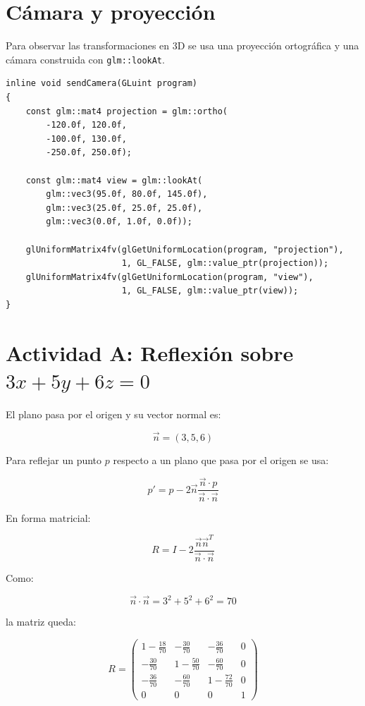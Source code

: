 \documentclass[12pt,a4paper]{article}
\begin{document}
\section*{C\'amara y proyecci\'on}
Para observar las transformaciones en 3D se usa una proyecci\'on ortogr\'afica y una c\'amara construida con \texttt{glm::lookAt}.

\begin{lstlisting}[style=cxxcolor,caption={Envio de matrices de camara al shader.}]
inline void sendCamera(GLuint program)
{
    const glm::mat4 projection = glm::ortho(
        -120.0f, 120.0f,
        -100.0f, 130.0f,
        -250.0f, 250.0f);

    const glm::mat4 view = glm::lookAt(
        glm::vec3(95.0f, 80.0f, 145.0f),
        glm::vec3(25.0f, 25.0f, 25.0f),
        glm::vec3(0.0f, 1.0f, 0.0f));

    glUniformMatrix4fv(glGetUniformLocation(program, "projection"),
                       1, GL_FALSE, glm::value_ptr(projection));
    glUniformMatrix4fv(glGetUniformLocation(program, "view"),
                       1, GL_FALSE, glm::value_ptr(view));
}
\end{lstlisting}

\section*{Actividad A: Reflexi\'on sobre $3x+5y+6z=0$}
El plano pasa por el origen y su vector normal es:

\[
\vec{n}=(3,5,6)
\]

Para reflejar un punto $p$ respecto a un plano que pasa por el origen se usa:

\[
p' = p - 2\vec{n}\frac{\vec{n}\cdot p}{\vec{n}\cdot \vec{n}}
\]

En forma matricial:

\[
R = I - 2\frac{\vec{n}\vec{n}^{T}}{\vec{n}\cdot\vec{n}}
\]

Como:

\[
\vec{n}\cdot\vec{n}=3^2+5^2+6^2=70
\]

la matriz queda:

\[
R =
\begin{pmatrix}
1-\frac{18}{70} & -\frac{30}{70} & -\frac{36}{70} & 0\\
-\frac{30}{70} & 1-\frac{50}{70} & -\frac{60}{70} & 0\\
-\frac{36}{70} & -\frac{60}{70} & 1-\frac{72}{70} & 0\\
0 & 0 & 0 & 1
\end{pmatrix}
\]
\end{document}
